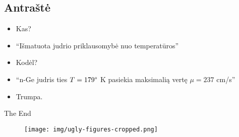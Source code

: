 \documentclass{beamer}
\makeatletter
\newcommand*{\currentname}{\@currentlabelname}
\makeatother
\begin{document}
\subsection{Antraštė}
\frame{\tableofcontents[currentsection, subsectionstyle=show/shaded/hide]}

\begin{frame}{\currentname}
  \begin{itemize}[<+->]
    \item<1-> Kas?
    \item<3-> ``Išmatuota judrio priklausomybė nuo temperatūros''
    \item<2-> Kodėl?
    \item<4-> ``n-Ge judris ties $T=179\degree$ K pasiekia maksimalią vertę $\mu=237$ cm/s''
    \item<5-> Trumpa.
  \end{itemize}
\end{frame}

\begin{frame}[plain,c]
\begin{center}
\Huge The End
\end{center}
\end{frame}

\begin{frame}
  \begin{figure}
    \begin{center} 
      \texttt{[image: img/ugly-figures-cropped.png]}
    \end{center}
  \end{figure}
\end{frame}
\end{document}
